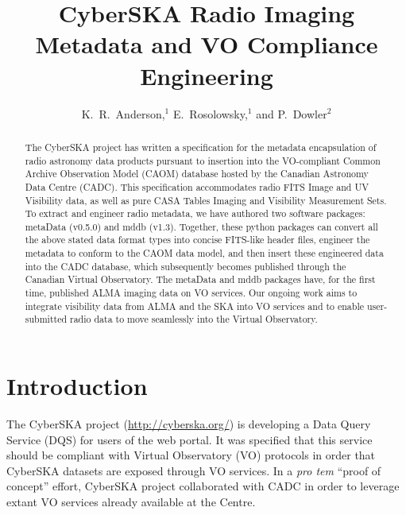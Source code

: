 
\resetcounters





\title{CyberSKA Radio Imaging Metadata and VO Compliance Engineering}
\author{K.~R.~Anderson,$^1$ E.~Rosolowsky,$^1$ and P.~Dowler$^2$
}


\begin{abstract}
The CyberSKA project has written a specification for the metadata encapsulation of radio astronomy data products pursuant to insertion into the VO-compliant Common Archive Observation Model (CAOM) database hosted by the Canadian Astronomy Data Centre (CADC). This specification accommodates radio FITS Image and UV Visibility data, as well as pure CASA Tables Imaging and Visibility Measurement Sets. To extract and engineer radio metadata, we have authored two software packages: metaData (v0.5.0) and mddb (v1.3). Together, these python packages can convert all the above stated data format types into concise FITS-like header files, engineer the metadata to conform to the CAOM data model, and then insert these engineered data into the CADC database, which subsequently becomes published through the Canadian Virtual Observatory. The metaData and mddb packages have, for the first time, published ALMA imaging data on VO services. Our ongoing work aims to integrate visibility data from ALMA and the SKA into VO services and to enable user-submitted radio data to move seamlessly into the Virtual Observatory. 
\end{abstract}

\section{Introduction}
The CyberSKA project  (\url{http://cyberska.org/}) is developing a Data Query Service (DQS) for users of the web portal. It was specified that this service should be compliant with Virtual Observatory (VO) protocols in order that CyberSKA datasets are exposed through VO services. In a \textit{pro tem} ``proof of concept'' effort, CyberSKA project collaborated with CADC in order to leverage extant VO services already available at the Centre.

